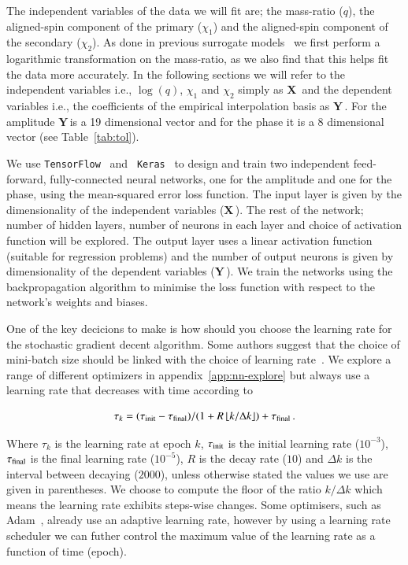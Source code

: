 \documentclass[aps,prd,reprint,superscriptaddress,preprintnumbers,showpacs,nofootinbib]{revtex4-1}
\newcommand{\X}{$\mathbf{X}\,$}
\newcommand{\Y}{$\mathbf{Y}\,$}
\newcommand{\floor}[1]{\left\lfloor #1 \right\rfloor}
\begin{document}
The independent variables of the data we will fit are; the mass-ratio ($q$), the
aligned-spin component of the primary ($\chi_{1}$) and the aligned-spin
component of the secondary ($\chi_{2}$). As done in previous surrogate
models~\cite{PhysRevD.99.064045,2020PhRvD.101h1502R} we first perform a
logarithmic transformation on the mass-ratio, as we also find that this helps
fit the data more accurately. In the following sections we will refer to the
independent variables i.e., $\log(q)$, $\chi_{1}$ and $\chi_{2}$ simply as \X
and the dependent variables i.e., the coefficients of the empirical
interpolation basis as \Y. For the amplitude \Y is a 19 dimensional vector and
for the phase it is a 8 dimensional vector (see Table~\ref{tab:tol}).

We use {\tt TensorFlow}~\cite{tensorflow2015-whitepaper} and {\tt
Keras}~\cite{chollet2015keras} to design and train two independent feed-forward,
fully-connected neural networks, one for the amplitude and one for the phase,
using the mean-squared error loss function. The input layer is given by the
dimensionality of the independent variables (\X). The rest of the network;
number of hidden layers, number of neurons in each layer and choice of
activation function will be explored. The output layer uses a linear activation
function (suitable for regression problems) and the number of output neurons is
given by dimensionality of the dependent variables (\Y). We train the networks
using the backpropagation algorithm to minimise the loss function with respect
to the network's weights and biases.

One of the key decicions to make is how should you choose the learning rate
for the stochastic gradient decent algorithm.
Some authors suggest that the choice of mini-batch size should be linked with
the choice of learning rate~\cite{2017arXiv170508741H, Granziol2020CurvatureIK}.
We explore a range of different optimizers in appendix~\ref{app:nn-explore}
but always use a learning rate that decreases with time according to

\begin{equation}
\tau_{k} = (\tau_{\rm{init}} - \tau_{\rm{final}}) / (1 + R \floor{k/\Delta k}) + \tau_{\rm{final}} \, .
\label{eq:lrs}
\end{equation}

Where $\tau_{k}$ is the learning rate at epoch $k$, $\tau_{\rm{init}}$ is the
initial learning rate ($10^{-3}$), $\tau_{\rm{final}}$ is the final learning
rate ($10^{-5}$), $R$ is the decay rate ($10$) and $\Delta k$ is the interval
between decaying ($2000$), unless otherwise stated the values we use are given
in parentheses. We choose to compute the floor of the ratio $k/\Delta k$ which
means the learning rate exhibits steps-wise changes. Some optimisers, such as
Adam~\cite{Kingma2015AdamAM}, already use an adaptive learning rate, however by
using a learning rate scheduler we can futher control the maximum value of the
learning rate as a function of time (epoch).
\end{document}
